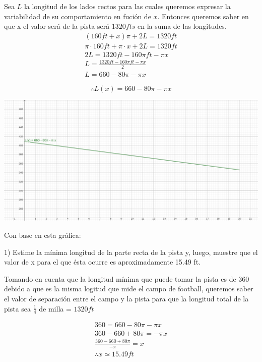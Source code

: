 Sea $L$ la longitud de los lados rectos para las cuales queremos expresar la variabilidad de su comportamiento en fución de $x$.
Entonces queremos saber en que x el valor será de la pista será $1320fts$ en la suma de las longitudes.
\begin{gather*}
    (160ft+x)\pi + 2L = 1320ft\\
    \pi\cdot160ft+\pi\cdot x + 2L = 1320ft\\
    2L = 1320ft - 160\pi ft -\pi x\\
    L=\frac{1320ft - 160\pi ft -\pi x}{2}\\
    L=660-80\pi - \pi x
\end{gather*}

$$\therefore L(x)=660 - 80\pi-\pi x$$

\begin{center}
        \includegraphics[height = 0.3\textheight]{recursos/geogebra-export.png}\par
\end{center}


Con base en esta
gráfica:

1) Estime la mínima longitud de la parte recta de la pista y, luego, muestre que el valor de x para el que ésta ocurre es aproximadamente 15.49 ft.

Tomando en cuenta que la longitud mínima que puede tomar la pista es de 360 debido a que es la misma logitud que mide el campo de football, queremos saber el valor de separación entre el campo y la pista para que la longitud total de la pista sea $\frac{1}{4}$ de milla = $1320ft$

\begin{gather*}
    360=660-80\pi-\pi x\\
    360-660+80\pi=-\pi x\\
    \frac{360-660+80\pi}{-\pi}=x\\
    \therefore x\simeq 15.49ft
\end{gather*}

